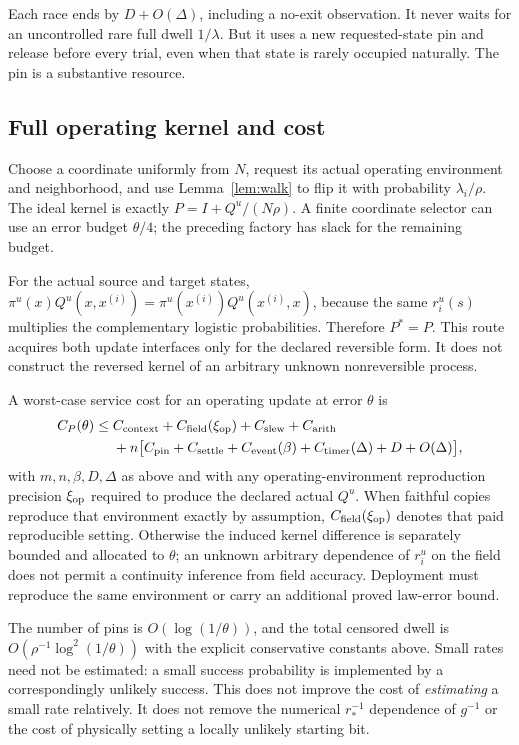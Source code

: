 Each race ends by $D+O(\Delta)$, including a no-exit observation. It never
waits for an uncontrolled rare full dwell $1/\lambda$. But it uses a new
requested-state pin and release before every trial, even when that state
is rarely occupied naturally. The pin is a substantive resource.

\subsection{Full operating kernel and cost}

Choose a coordinate uniformly from $N$, request its actual operating
environment and neighborhood, and use Lemma~\ref{lem:walk} to flip it with
probability $\lambda_i/\rho$. The ideal kernel is exactly
$P=I+Q^u/(N\rho)$. A finite coordinate selector can use an error budget
$\theta/4$; the preceding factory has slack for the remaining budget.

For the actual source and target states,
$\pi^u(x)Q^u(x,x^{(i)})=\pi^u(x^{(i)})Q^u(x^{(i)},x)$, because the
same $r_i^u(s)$ multiplies the complementary logistic probabilities.
Therefore $P^*=P$. This route acquires both update interfaces only for the
declared reversible form. It does not construct the reversed kernel of an
arbitrary unknown nonreversible process.

A worst-case service cost for an operating update at error $\theta$ is
\begin{equation}\label{eq:flipcost}
\begin{split}
 C_P(\theta)\le{}&C_{\rm context}+C_{\rm field}(\xi_{\rm op})
                  +C_{\rm slew}+C_{\rm arith}\\
 &+n\big[C_{\rm pin}+C_{\rm settle}
       +C_{\rm event}(\beta)+C_{\rm timer}(\Delta)
       +D+O(\Delta)\big],
\end{split}
\end{equation}
with $m,n,\beta,D,\Delta$ as above and with any operating-environment
reproduction precision $\xi_{\rm op}$ required to produce the declared
actual $Q^u$. When faithful copies reproduce that environment exactly by
assumption, $C_{\rm field}(\xi_{\rm op})$ denotes that paid reproducible
setting. Otherwise the induced kernel difference is separately bounded
and allocated to $\theta$; an unknown arbitrary dependence of $r_i^u$
on the field does not permit a continuity inference from field accuracy.
Deployment must reproduce the same environment or carry an additional
proved law-error bound.

The number of pins is $O(\log(1/\theta))$, and the total censored dwell is
$O(\rho^{-1}\log^2(1/\theta))$ with the explicit conservative constants
above. Small rates need not be estimated: a small success probability is
implemented by a correspondingly unlikely success. This does not improve
the cost of \emph{estimating} a small rate relatively. It does not remove
the numerical $r_*^{-1}$ dependence of $g^{-1}$ or the cost of physically
setting a locally unlikely starting bit.
